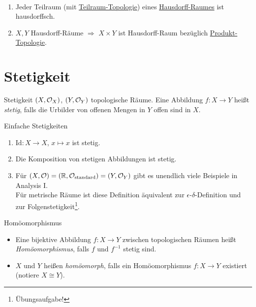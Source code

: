 \begin{remark}
  \
  \begin{enumerate}
    \item Jeder Teilraum (mit \hyperref[def:teilraumtopologie]{Teilraum-Topologie}) eines \hyperref[def:hausdorffsch]{Hausdorff-Raumes} ist hausdorffsch. 
    \item $ X, Y $ Hausdorff-Räume $ \Rightarrow $ $ X \times Y $ ist Hausdorff-Raum bezüglich \hyperref[def:produkttopologie]{Produkt-Topologie}.
  \end{enumerate}
\end{remark}

\section{Stetigkeit}

\begin{definition}{Stetigkeit}
  $ (X, \mathcal{O}_X) $, $ (Y, \mathcal{O}_Y) $ topologische Räume. Eine Abbildung $ f : X \to Y $ heißt \emph{stetig}, falls die Urbilder von offenen Mengen in $ Y $ offen sind in $ X $.
\end{definition}

\begin{example}{Einfache Stetigkeiten}
  \begin{enumerate}
    \item $ \text{Id}: X \to X $, $ x \mapsto x $ ist stetig.
    \item Die Komposition von stetigen Abbildungen ist stetig.
    \item Für $ (X, \mathcal{O}) = (\mathbb{R}, \mathcal{O}_\text{standard}) = (Y, \mathcal{O}_Y) $ gibt es unendlich viele Beispiele in Analysis I. \\
    Für metrische Räume ist diese  Definition äquivalent zur $ \epsilon $-$ \delta $-Definition und zur Folgenstetigkeit\footnote{Übungsaufgabe!}.
  \end{enumerate}
\end{example}

\begin{definition}{Homöomorphismus}
  \begin{itemize}
    \item Eine bijektive Abbildung $ f: X \to Y $ zwischen topologischen Räumen heißt \emph{Homöomorphismus}, falls $ f $ und $ f^{-1} $ stetig sind.
    \item $ X $ und $ Y $ heißen \emph{homöomorph}, falls ein Homöomorphismus $ f: X \to Y $ existiert (notiere $ X \cong Y $). 
  \end{itemize}
\end{definition}

